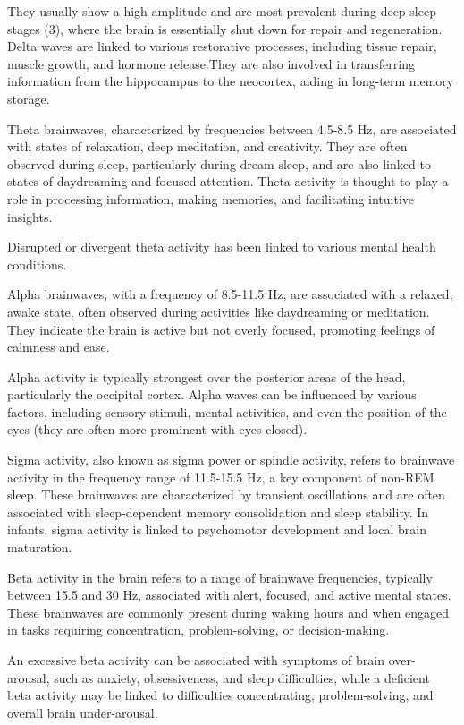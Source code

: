 They usually show a high amplitude and are most prevalent during deep sleep stages (3), where the brain is essentially shut down for repair and regeneration. Delta waves are linked to various restorative processes, including tissue repair, muscle growth, and hormone release.They are also involved in transferring information from the hippocampus to the neocortex, aiding in long-term memory storage.

Theta brainwaves, characterized by frequencies between 4.5-8.5 Hz, are associated with states of relaxation, deep meditation, and creativity. They are often observed during sleep, particularly during dream sleep, and are also linked to states of daydreaming and focused attention. Theta activity is thought to play a role in processing information, making memories, and facilitating intuitive insights. 

Disrupted or divergent theta activity has been linked to various mental health conditions.

Alpha brainwaves, with a frequency of 8.5-11.5 Hz, are associated with a relaxed, awake state, often observed during activities like daydreaming or meditation. They indicate the brain is active but not overly focused, promoting feelings of calmness and ease. 

Alpha activity is typically strongest over the posterior areas of the head, particularly the occipital cortex. Alpha waves can be influenced by various factors, including sensory stimuli, mental activities, and even the position of the eyes (they are often more prominent with eyes closed). 

Sigma activity, also known as sigma power or spindle activity, refers to brainwave activity in the frequency range of 11.5-15.5 Hz, a key component of non-REM sleep. These brainwaves are characterized by transient oscillations and are often associated with sleep-dependent memory consolidation and sleep stability. In infants, sigma activity is linked to psychomotor development and local brain maturation.

Beta activity in the brain refers to a range of brainwave frequencies, typically between 15.5 and 30 Hz, associated with alert, focused, and active mental states. These brainwaves are commonly present during waking hours and when engaged in tasks requiring concentration, problem-solving, or decision-making.

An excessive beta activity can be associated with symptoms of brain over-arousal, such as anxiety, obsessiveness, and sleep difficulties, while a deficient beta activity may be linked to difficulties concentrating, problem-solving, and overall brain under-arousal.

